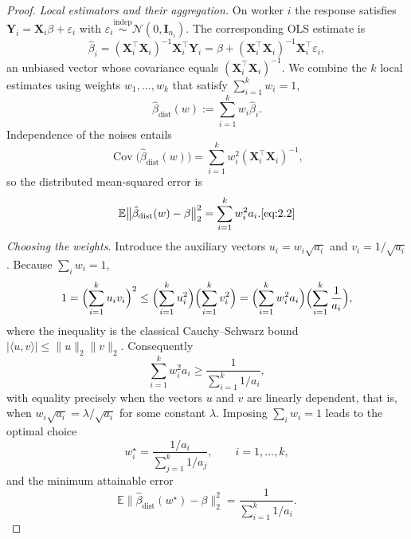 \documentclass[11pt]{article}
\numberwithin{equation}{section}
\theoremstyle{plain}
\theoremstyle{definition}
\theoremstyle{remark}
\begin{document}
\begin{appendix}
\begin{proof}
      \medskip
      \textit{Local estimators and their aggregation.}
      On worker $i$ the response satisfies
      $\mathbf{Y}_i=\mathbf{X}_i\beta+\varepsilon_i$ with
      $\varepsilon_i\stackrel{\text{indep}}{\sim}\mathcal N(0,\mathbf{I}_{n_i})$.
      The corresponding OLS estimate is
      \[
        \hat\beta_i
         =(\mathbf{X}_i^{\top}\mathbf{X}_i)^{-1}\mathbf{X}_i^{\top}\mathbf{Y}_i
         =\beta+(\mathbf{X}_i^{\top}\mathbf{X}_i)^{-1}\mathbf{X}_i^{\top}\varepsilon_i ,
      \]
      an unbiased vector whose covariance equals $(\mathbf{X}_i^{\top}\mathbf{X}_i)^{-1}$.
      We combine the $k$ local estimates using weights
      $w_1,\dots,w_k$ that satisfy $\sum_{i=1}^{k}w_i=1$,
      \[
        \hat\beta_{\mathrm{dist}}(w)
          :=\sum_{i=1}^{k}w_i\hat\beta_i .
      \]
      Independence of the noises entails
      \[
        \operatorname{Cov}\!\bigl(\hat\beta_{\mathrm{dist}}(w)\bigr)
          =\sum_{i=1}^{k}w_i^{2}(\mathbf{X}_i^{\top}\mathbf{X}_i)^{-1},
      \]
      so the distributed mean-squared error is
      \[
        \mathbb E\bigl\|\hat\beta_{\mathrm{dist}}(w)-\beta\bigr\|_{2}^{2}
          =\sum_{i=1}^{k}w_i^{2}a_i .\ref{eq:2.2}
      \]
      \medskip
      \textit{Choosing the weights.}
      Introduce the auxiliary vectors
      $u_i=w_i\sqrt{a_i}$ and $v_i=1/\sqrt{a_i}$.
      Because $\sum_i w_i=1$,
      \[
        1=\Bigl(\sum_{i=1}^{k}u_iv_i\Bigr)^{2}
          \le
          \Bigl(\sum_{i=1}^{k}u_i^{2}\Bigr)
          \Bigl(\sum_{i=1}^{k}v_i^{2}\Bigr)
          =\Bigl(\sum_{i=1}^{k}w_i^{2}a_i\Bigr)
           \Bigl(\sum_{i=1}^{k}\frac1{a_i}\Bigr),
      \]
      where the inequality is the classical Cauchy–Schwarz bound
      $|\langle u,v\rangle|\le\|u\|_2\|v\|_2$.
      Consequently
      \[
        \sum_{i=1}^{k}w_i^{2}a_i
         \ge\frac{1}{\sum_{i=1}^{k}1/a_i},
      \]
      with equality precisely when the vectors $u$ and $v$
      are linearly dependent, that is, when
      $w_i\sqrt{a_i}=\lambda/\sqrt{a_i}$ for some constant $\lambda$.
      Imposing $\sum_i w_i=1$ leads to the optimal choice
      \[
        w_i^{\star}
          =\frac{\displaystyle 1/a_i}
             {\displaystyle\sum_{j=1}^{k}1/a_j},
          \qquad i=1,\dots,k,
      \]
      and the minimum attainable error
      \[
        \mathbb E\bigl\|\hat\beta_{\mathrm{dist}}(w^{\star})-\beta\bigr\|_{2}^{2}
          =\frac{1}{\displaystyle\sum_{i=1}^{k}1/a_i}.
      \]


\end{proof}
\end{appendix}
\end{document}
